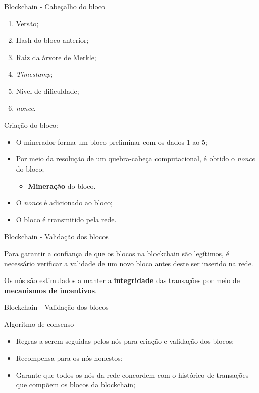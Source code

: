 \begin{frame}{Blockchain - Cabeçalho do bloco}
    \begin{enumerate}
        \item Versão;
        \item Hash do bloco anterior;
        \item Raiz da árvore de Merkle;
        \item \textit{Timestamp};
        \item Nível de dificuldade;
        \item \textit{nonce}.
    \end{enumerate}
    Criação do bloco:
    \begin{itemize}
        \item O minerador forma um bloco preliminar com os dados 1 ao 5;
        \item Por meio da resolução de um quebra-cabeça computacional, é obtido o \textit{nonce} do bloco;
        \begin{itemize}
            \item \textbf{Mineração} do bloco.
        \end{itemize}
        \item O \textit{nonce} é adicionado ao bloco;
        \item O bloco é transmitido pela rede.
    \end{itemize}
\end{frame}

\begin{frame}{Blockchain - Validação dos blocos}
    \begin{block}{}
    Para garantir a confiança de que os blocos na blockchain são legítimos, é necessário verificar a validade de um novo bloco antes deste ser inserido na rede.
    \end{block}
    \begin{block}{}
    Os nós são estimulados a manter a \textbf{integridade} das transações por meio de \textbf{mecanismos de incentivos}.
    \end{block}
\end{frame}

\begin{frame}{Blockchain - Validação dos blocos}
    \begin{block}{Algoritmo de consenso}
    \begin{itemize}
        \item Regras a serem seguidas pelos nós para criação e validação dos blocos;
        \item Recompensa para os nós honestos;
        \item Garante que todos os nós da rede concordem com o histórico de transações que compõem os blocos da blockchain;
    \end{itemize}
    \end{block}    
\end{frame}

